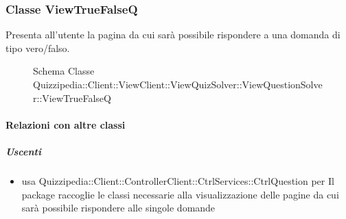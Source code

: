 \subsubsection{Classe ViewTrueFalseQ}
Presenta all'utente la pagina da cui sarà possibile rispondere a una domanda di tipo vero/falso.
\begin{figure}[H]
\centering
\noindent{}
\caption[Schema Classe ViewTrueFalseQ]{Schema Classe Quizzipedia::Client::ViewClient::ViewQuizSolver::ViewQuestionSolver::ViewTrueFalseQ}
\end{figure}
\paragraph{Relazioni con altre classi}
\subparagraph{Uscenti}
\begin{itemize}
\item usa Quizzipedia::Client::ControllerClient::CtrlServices::CtrlQuestion per Il package raccoglie le classi necessarie alla visualizzazione delle pagine da cui sarà possibile rispondere alle singole domande
\end{itemize}
